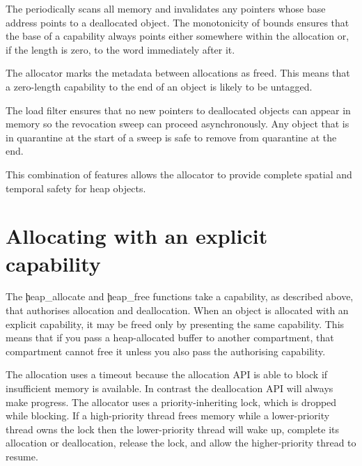 The  periodically scans all memory and invalidates any pointers whose base address points to a deallocated object.
The monotonicity of bounds ensures that the base of a capability always points either somewhere within the allocation or, if the length is zero, to the word immediately after it.

\begin{note}
The allocator marks the metadata between allocations as freed.
This means that a zero-length capability to the end of an object is likely to be untagged.
\end{note}

The load filter ensures that no new pointers to deallocated objects can appear in memory so the revocation sweep can proceed asynchronously.
Any object that is in quarantine at the start of a sweep is safe to remove from quarantine at the end.

This combination of features allows the allocator to provide complete spatial and temporal safety for heap objects.

\section{Allocating with an explicit capability}



The \c{heap_allocate} and \c{heap_free} functions take a capability, as described above, that authorises allocation and deallocation.
When an object is allocated with an explicit capability, it may be freed only by presenting the same capability.
This means that if you pass a heap-allocated buffer to another compartment, that compartment cannot free it unless you also pass the authorising capability.

\begin{note}
	The allocation uses a timeout because the allocation API is able to block if insufficient memory is available.
	In contrast the deallocation API will always make progress.
	The allocator uses a priority-inheriting lock, which is dropped while blocking.
	If a high-priority thread frees memory while a lower-priority thread owns the lock then the lower-priority thread will wake up, complete its allocation or deallocation, release the lock, and allow the higher-priority thread to resume.
\end{note}

